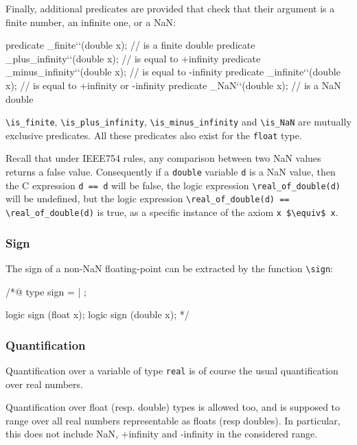 Finally, additional predicates are provided that check that their argument
is a finite number, an infinite one, or a NaN:
\begin{listing}{1}
predicate \is_finite``(double x); // is a finite double
predicate \is_plus_infinity``(double x); // is equal to +infinity
predicate \is_minus_infinity``(double x); // is equal to -infinity
predicate \is_infinite``(double x); // is equal to +infinity or -infinity
predicate \is_NaN``(double x); // is a NaN double
\end{listing}
\lstinline|\is_finite|, \lstinline|\is_plus_infinity|,
\lstinline|\is_minus_infinity| and \lstinline|\is_NaN| are mutually
exclusive predicates.
All these predicates also exist for the \lstinline|float| type.

Recall that under IEEE754 rules, any comparison between two NaN values returns a false value. 
Consequently if a \lstinline|double| variable \lstinline|d| is a  
NaN value, then the C expression \lstinline|d == d| will be 
false, the logic expression \lstinline|\real_of_double(d)| will be undefined,
but the logic expression 
\lstinline|\real_of_double(d) == \real_of_double(d)| is true, as a specific instance of the axiom \lstinline|x $\equiv$ x|.
\subsubsection{Sign}

The sign of a non-NaN floating-point  can be extracted by
the function \lstinline|\sign|:
\begin{listing}{1}
/*@
 type sign = \Positive | \Negative;

 logic sign \sign(float x);
 logic sign \sign(double x);
*/
\end{listing}


\subsubsection{Quantification}

Quantification over a variable of type \lstinline|real| is of course the usual
quantification over real numbers.

Quantification over float (resp. double) types is allowed too, and is
supposed to range over all real numbers representable as floats (resp
doubles). In particular, this does not include NaN, +infinity and
-infinity in the considered range.


